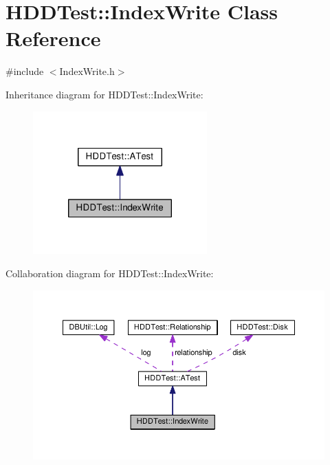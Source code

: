 \hypertarget{class_h_d_d_test_1_1_index_write}{\section{H\-D\-D\-Test\-:\-:Index\-Write Class Reference}
\label{class_h_d_d_test_1_1_index_write}
}


{\ttfamily \#include $<$Index\-Write.\-h$>$}



Inheritance diagram for H\-D\-D\-Test\-:\-:Index\-Write\-:
\nopagebreak
\begin{figure}[H]
\begin{center}
\leavevmode
\includegraphics[width=190pt]{class_h_d_d_test_1_1_index_write__inherit__graph}
\end{center}
\end{figure}


Collaboration diagram for H\-D\-D\-Test\-:\-:Index\-Write\-:
\nopagebreak
\begin{figure}[H]
\begin{center}
\leavevmode
\includegraphics[width=350pt]{class_h_d_d_test_1_1_index_write__coll__graph}
\end{center}
\end{figure}
